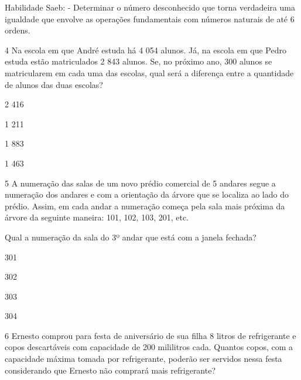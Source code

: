 {{Habilidade Saeb: - Determinar o número desconhecido que torna verdadeira
uma igualdade que envolve as operações fundamentais com números naturais
de até 6 ordens.}

\num{4} Na escola em que André estuda há 4 054 alunos. Já, na escola em que
Pedro estuda estão matriculados 2 843 alunos. Se, no próximo ano, 300
alunos se matricularem em cada uma das escolas, qual será a diferença
entre a quantidade de alunos das duas escolas?

\begin{escolha}
\item
  2 416
\item
  1 211
\item
  1 883
\item
  1 463
\end{escolha}


\num{5} A numeração das salas de um novo prédio comercial de 5 andares
segue a numeração dos andares e com a orientação da árvore que se
localiza ao lado do prédio. Assim, em cada andar a numeração começa pela
sala mais próxima da árvore da seguinte maneira: 101, 102, 103, 201,
etc.


Qual a numeração da sala do 3º andar que está com a janela fechada?

\begin{escolha}
\item
  301
\item
  302
\item
  303
\item
  304
\end{escolha}


\num{6} Ernesto comprou para festa de aniversário de sua filha 8 litros de
refrigerante e copos descartáveis com capacidade de 200 mililitros cada.
Quantos copos, com a capacidade máxima tomada por refrigerante, poderão
ser servidos nessa festa considerando que Ernesto não comprará mais
refrigerante?

}
